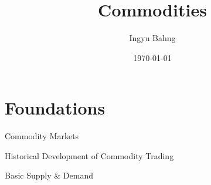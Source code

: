\documentclass[10pt]{article}
\title{Commodities}
\date{\today}
\author{Ingyu Bahng}
\begin{document}


\section{Foundations}

  \begin{core}{Commodity Markets}



  \end{core}

  \begin{core}{Historical Development of Commodity Trading}





  \end{core}

  \begin{core}{Basic Supply \& Demand} %


  \end{core}
\end{document}
